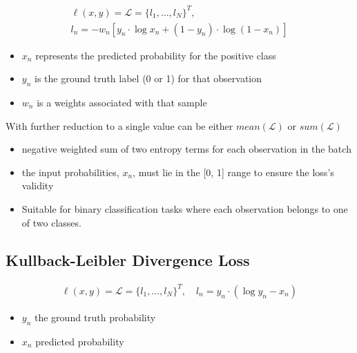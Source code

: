 \documentclass[11pt]{article}
\begin{document}
\begin{definition}\label{eq:binary-cross-entropy-loss}
    \begin{align*}
        \ell (x,y) = \mathcal{L} = \{l_1,\ldots,l_N\}^T, \\
        l_n = -w_n[y_n \cdot \log x_n + (1-y_n) \cdot \log (1- x_n)]
    \end{align*}

    \begin{itemize}
        \item $x_n$ represents the predicted probability for the positive class
        \item $y_n$ is the ground truth label (0 or 1) for that observation
        \item $w_n$ is a weights associated with that sample
    \end{itemize}

    With further reduction to a single value can be either $mean(\mathcal L)$ or $sum(\mathcal{L})$ 
\end{definition}

\begin{itemize}
    \item negative weighted sum of two entropy terms for each observation in the batch
    \item the input probabilities, $x_n$, must lie in the [0, 1] range to ensure the loss's validity
    \item Suitable for binary classification tasks where each observation belongs to one of two classes.
\end{itemize}

\subsection{Kullback-Leibler Divergence Loss}

\begin{definition}\label{eq:kullback-loss}
    \begin{align*}
        \ell (x,y) = \mathcal{L} = \{l_1,\ldots,l_N\}^T, \quad l_n = y_n \cdot (\log y_n - x_n)
    \end{align*}

    \begin{itemize}
        \item $y_n$ the ground truth probability
        \item $x_n$ predicted probability
    \end{itemize}
\end{definition}
\end{document}
